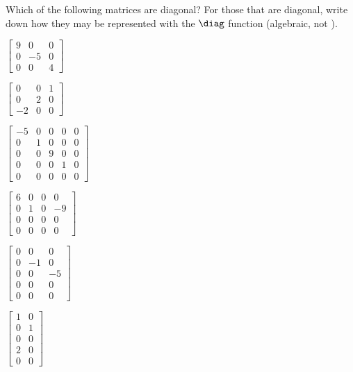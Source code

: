 \begin{exercise}  
Which of the following matrices are diagonal? 
For those that are diagonal, write down how they may be represented with the \(\diag\) function (algebraic, not \script).

\begin{Parts}
\item \(\begin{bmatrix} 9&0&0
\\0&-5&0
\\0&0&4 \end{bmatrix}\)

\item \(\begin{bmatrix} 0&0&1
\\0&2&0
\\-2&0&0 \end{bmatrix}\)

\item \(\begin{bmatrix} -5&0&0&0&0
\\0&1&0&0&0
\\0&0&9&0&0
\\0&0&0&1&0
\\0&0&0&0&0 \end{bmatrix}\)

\item \(\begin{bmatrix} 6&0&0&0
\\0&1&0&-9
\\0&0&0&0
\\0&0&0&0 \end{bmatrix}\)

\item \(\begin{bmatrix} 0&0&0
\\0&-1&0
\\0&0&-5
\\0&0&0
\\0&0&0 \end{bmatrix}\)

\item \(\begin{bmatrix} 1&0
\\0&1
\\0&0
\\2&0
\\0&0 \end{bmatrix}\)


\end{Parts}
\end{exercise}
